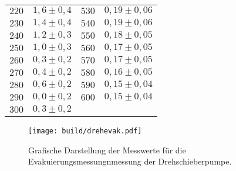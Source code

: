 \begin{table}[H]
\begin{tabular}{c c | c c}
    $220$ & $  1,6 \pm   0,4$  & $530$ & $ 0,19 \pm 0,06 $ \\
    $230$ & $  1,4 \pm   0,4$  & $540$ & $ 0,19 \pm 0,06 $ \\
    $240$ & $  1,2 \pm   0,3$  & $550$ & $ 0,18 \pm 0,05 $ \\
    $250$ & $  1,0 \pm   0,3$  & $560$ & $ 0,17 \pm 0,05 $ \\
    $260$ & $  0,3 \pm  0,2$   & $570$ & $ 0,17 \pm 0,05 $ \\
    $270$ & $  0,4 \pm  0,2$   & $580$ & $ 0,16 \pm 0,05 $ \\
    $280$ & $  0,6 \pm  0,2$   & $590$ & $ 0,15 \pm 0,04 $ \\
    $290$ & $  0,0 \pm  0,2$   & $600$ & $ 0,15 \pm 0,04 $ \\
    $300$ & $  0,3 \pm  0,2$   &       & $ $ \\
    \bottomrule
  \end{tabular}
\end{table}

\begin{figure}[H]
  \centering
  \texttt{[image: build/drehevak.pdf]}
  \caption{Grafische Darstellung der Messwerte für die Evakuierungsmessungnmessung der Drehschieberpumpe.}
  \label{fig:drehevak}
\end{figure}